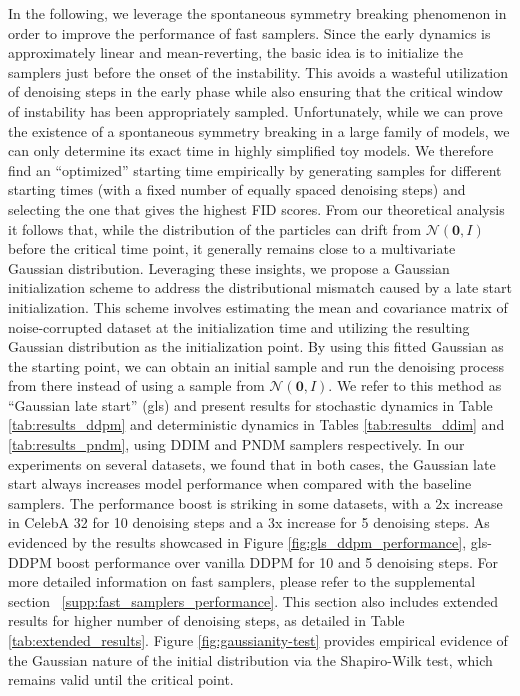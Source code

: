 \documentclass{article}
\newcommand{\vect}[1]{\boldsymbol{#1}}
\begin{document}
In the following, we leverage the spontaneous symmetry breaking phenomenon in order to improve the performance of fast samplers. Since the early dynamics is approximately linear and mean-reverting, the basic idea is to initialize the samplers just before the onset of the instability. This avoids a wasteful utilization of denoising steps in the early phase while also ensuring that the critical window of instability has been appropriately sampled. Unfortunately, while we can prove the existence of a spontaneous symmetry breaking in a large family of models, we can only determine its exact time in highly simplified toy models. We therefore find an ``optimized'' starting time empirically by generating samples for different starting times (with a fixed number of equally spaced denoising steps) and selecting the one that gives the highest FID scores. From our theoretical analysis it follows that, while the distribution of the particles can drift from $\mathcal{N}(\vect{0},I)$ before the critical time point, it generally remains close to a multivariate Gaussian distribution. Leveraging these insights, we propose a Gaussian initialization scheme to address the distributional mismatch caused by a late start initialization. This scheme involves estimating the mean and covariance matrix of noise-corrupted dataset at the initialization time and utilizing the resulting Gaussian distribution as the initialization point. By using this fitted Gaussian as the starting point, we can obtain an initial sample and run the denoising process from there instead of using a sample from $\mathcal{N}(\vect{0},I)$. We refer to this method as ``Gaussian late start'' (gls) and present results  for stochastic dynamics in Table \ref{tab:results_ddpm} and deterministic dynamics in Tables \ref{tab:results_ddim} and \ref{tab:results_pndm}, using DDIM  and  PNDM samplers respectively. In our experiments on several datasets, we found that in both cases, the Gaussian late start always increases model performance when compared with the baseline samplers. The performance boost is striking in some datasets, with a 2x increase in CelebA 32 for 10 denoising steps and a 3x increase for 5 denoising steps. As evidenced by the results showcased in Figure \ref{fig:gls_ddpm_performance}, gls-DDPM boost performance over vanilla DDPM for 10 and 5 denoising steps. For more detailed information on fast samplers, please refer to the supplemental section ~\ref{supp:fast_samplers_performance}. This section also includes extended results for higher number of denoising steps, as detailed in Table \ref{tab:extended_results}. Figure \ref{fig:gaussianity-test} provides empirical evidence of the Gaussian nature of the initial distribution via the Shapiro-Wilk test, which remains valid until the critical point.
\end{document}

